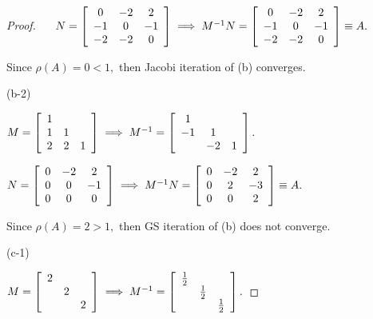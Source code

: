 \documentclass[11pt,a4paper]{article}
\renewcommand{\(}{\left(}
\renewcommand{\)}{\right)}
\begin{document}
\begin{proof}
  	\ \ $\ N=\left[
  	\begin{array}
  	[c]{ccc}%
  	0 & -2 & 2\\
  	-1 & 0 & -1\\
  	-2 & -2 & 0
  	\end{array}
  	\right]  \implies M^{-1}N=\left[
  	\begin{array}
  	[c]{ccc}%
  	0 & -2 & 2\\
  	-1 & 0 & -1\\
  	-2 & -2 & 0
  	\end{array}
  	\right]  \equiv A.$
  	
  	Since $\rho(A)=0<1,$ then Jacobi iteration of (b) converges.
  	
  	(b-2)
  	
  	$M=\left[
  	\begin{array}
  	[c]{ccc}%
  	1 &  & \\
  	1 & 1 & \\
  	2 & 2 & 1
  	\end{array}
  	\right]  \implies M^{-1}=\left[
  	\begin{array}
  	[c]{ccc}%
  	1 &  & \\
  	-1 & 1 & \\
  	& -2 & 1
  	\end{array}
  	\right]  .$
  	
  	$N=\left[
  	\begin{array}
  	[c]{ccc}%
  	0 & -2 & 2\\
  	0 & 0 & -1\\
  	0 & 0 & 0
  	\end{array}
  	\right]  \implies M^{-1}N=\left[
  	\begin{array}
  	[c]{ccc}%
  	0 & -2 & 2\\
  	0 & 2 & -3\\
  	0 & 0 & 2
  	\end{array}
  	\right]  \equiv A.$
  	
  	Since $\rho(A)=2>1,$ then GS iteration of (b) does not converge.
  	
  	(c-1)
  	
  	$M=\left[
  	\begin{array}
  	[c]{ccc}%
  	2 &  & \\
  	& 2 & \\
  	&  & 2
  	\end{array}
  	\right]  \implies M^{-1}=\left[
  	\begin{array}
  	[c]{ccc}%
  	\frac{1}{2} &  & \\
  	& \frac{1}{2} & \\
  	&  & \frac{1}{2}%
  	\end{array}
  	\right]  .$
  	

\end{proof}
\end{document}
